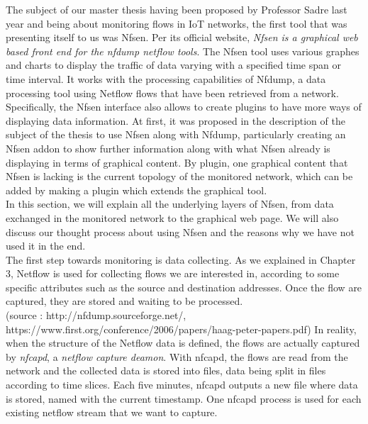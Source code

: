 The subject of our master thesis having been proposed by Professor Sadre last year and being about monitoring flows in IoT networks, the first tool that was presenting itself to us was Nfsen. Per its official website, \textit{Nfsen is a graphical web based front end for the nfdump netflow tools}. The Nfsen tool uses various graphes and charts to display the traffic of data varying with a specified time span or time interval. It works with the processing capabilities of Nfdump, a data processing tool using Netflow flows that have been retrieved from a network. Specifically, the Nfsen interface also allows to create plugins to have more ways of displaying data information. At first, it was proposed in the description of the subject of the thesis to use Nfsen along with Nfdump, particularly creating an Nfsen addon to show further information along with what Nfsen already is displaying in terms of graphical content. By plugin, one graphical content that Nfsen is lacking is the current topology of the monitored network, which can be added by making a plugin which extends the graphical tool.\\

In this section, we will explain all the underlying layers of Nfsen, from data exchanged in the monitored network to the graphical web page. We will also discuss our thought process about using Nfsen and the reasons why we have not used it in the end.\\

The first step towards monitoring is data collecting. As we explained in Chapter 3, Netflow is used for collecting flows we are interested in, according to some specific attributes such as the source and destination addresses. Once the flow are captured, they are stored and waiting to be processed. \\

(source : http://nfdump.sourceforge.net/, https://www.first.org/conference/2006/papers/haag-peter-papers.pdf)
In reality, when the structure of the Netflow data is defined, the flows are actually captured by \textit{nfcapd}, a \textit{netflow capture deamon}. With nfcapd, the flows are read from the network and the collected data is stored into files, data being split in files according to time slices. Each five minutes, nfcapd outputs a new file where data is stored, named with the current timestamp. One nfcapd process is used for each existing netflow stream that we want to capture.\\

